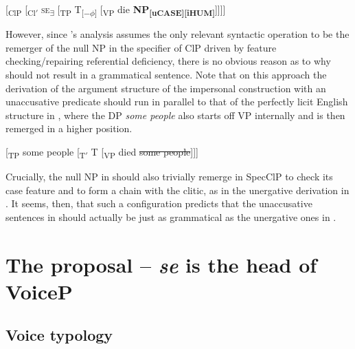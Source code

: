 \documentclass[output=paper,
modfonts,nonflat,
newtxmath
]{langsci/langscibook}
\begin{document}
\begin{exe}
\ex \label{ex:lenardic: 16} {[\textsubscript{ClP} [\textsubscript{Cl$'$} \textsc{se}\textsubscript{\textbf{$\exists$}} [\textsubscript{TP} T\textsubscript{[$-\phi$]}  [\textsubscript{VP} die \textbf{NP}\textsubscript{\textbf{[uCASE][iHUM]}}]]]]}
\end{exe} \par

\noindent However, since \citeauthor{riverosheppard2003}’s analysis assumes the only relevant syntactic operation to be the remerger of the null NP in the specifier of ClP driven by feature checking/repairing referential deficiency, there is no obvious reason as to why  should not result in a grammatical sentence. Note that on this approach the derivation of the argument structure of the impersonal construction with an unaccusative predicate should run in parallel to that of the perfectly licit English structure in , where the DP \textit{some people} also starts off VP internally and is then remerged in a higher position.

\begin{exe}
\ex \label{sope} {[\textsubscript{TP} some people [\textsubscript{T$'$} T [\textsubscript{VP} died \st{some people}]]]}
\end{exe}
\noindent Crucially, the null NP in  should also trivially remerge in SpecClP to check its case feature and to form a chain with the clitic, as in  the unergative derivation in . It seems, then, that such a configuration predicts that the unaccusative sentences in  should actually be just as grammatical as the unergative ones in .

\section{The proposal -- \textit{se} is the head of VoiceP} \label{sec4}

\subsection{ Voice typology} \label{sec4.1}
\end{document}
